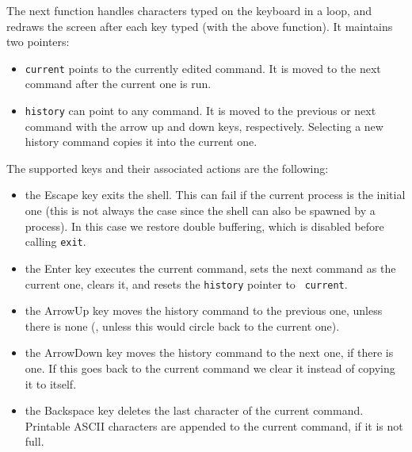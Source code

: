 
The next function handles characters typed on the keyboard in a loop, and
redraws the screen after each key typed (with the above function). It maintains
two pointers:
\begin{itemize}
  \item {\tt current} points to the currently edited command. It is moved to
  the next command after the current one is run.

  \item {\tt history} can point to any command. It is moved to the previous or
  next command with the arrow up and down keys, respectively. Selecting a new
  history command copies it into the current one.
\end{itemize}
\noindent The supported keys and their associated actions are the following:
\begin{itemize}
  \item the Escape key exits the shell. This can fail if the current process is
  the initial one (this is not always the case since the shell can also be
  spawned by a process). In this case we restore double buffering, which is
  disabled before calling {\tt exit}.

  \item the Enter key executes the current command, sets the next command as
  the current one, clears it, and resets the {\tt history} pointer to {\tt
  current}.

  \item the ArrowUp key moves the history command to the previous one, unless
  there is none (\ie, unless this would circle back to the current one).

  \item the ArrowDown key moves the history command to the next one, if there
  is one. If this goes back to the current command we clear it instead of
  copying it to itself.

  \item the Backspace key deletes the last character of the current command.
  Printable ASCII characters are appended to the current command, if it is not
  full.
\end{itemize}


